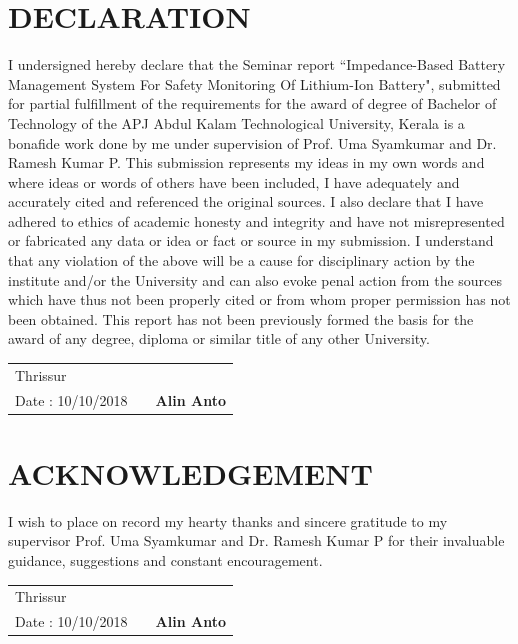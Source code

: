 \documentclass[12pt,a4paper]{report}
\begin{document}
\section*{DECLARATION\centering}
   	I undersigned hereby declare that the Seminar report ``Impedance-Based Battery Management System For Safety Monitoring Of Lithium-Ion Battery", submitted for partial fulfillment of the requirements for the award of degree of Bachelor of Technology of the APJ Abdul Kalam Technological University, Kerala is a bonafide work done by me under supervision of Prof. Uma Syamkumar and Dr. Ramesh Kumar P. This submission represents my ideas in my own words and where ideas or words of others have been included, I have adequately and accurately cited and referenced the original sources. I also declare that I have adhered to ethics of academic honesty and integrity and have not misrepresented or fabricated any data or idea or fact or source in my submission. I understand that any violation of the above will be a cause for disciplinary action by the institute and/or the University and can also evoke penal action from the sources which have thus not been properly cited or from whom proper permission has not been obtained. This report has not been previously formed the basis for the award of any degree, diploma or similar title of any other University. \\
\vspace{0.3in}
\newline
	\begin{tabular}{lp{3.5in}r}
		Thrissur  & & \\
		Date : 10/10/2018 & & \textbf{Alin Anto}
	\end{tabular}
\thispagestyle{empty}
\clearpage

\section*{ACKNOWLEDGEMENT\centering}
	I wish to place on record my hearty thanks and sincere gratitude to my supervisor Prof. Uma Syamkumar and Dr. Ramesh Kumar P  for their invaluable guidance, suggestions and constant encouragement. \\
\vspace{0.3in}
\newline
	\begin{tabular}{lp{3.5in}r}
		Thrissur  & & \\
		Date : 10/10/2018 & & \textbf{Alin Anto}
	\end{tabular}
\thispagestyle{empty}
\clearpage
\end{document}
